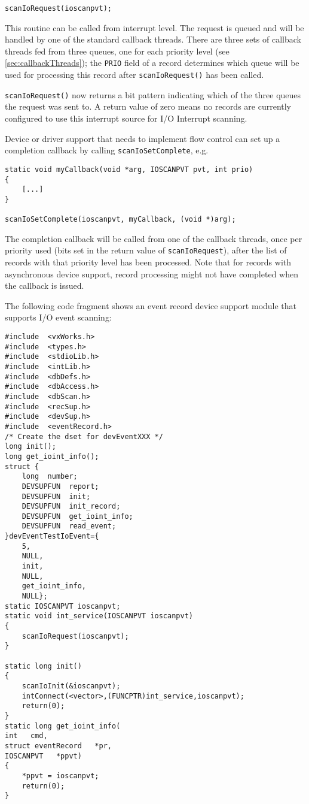 \begin{enumerate}
\begin{verbatim}
scanIoRequest(ioscanpvt);
\end{verbatim}

This routine can be called from interrupt level.
The request is queued and will be handled by one of the standard callback threads.
There are three sets of callback threads fed from three queues, one for each priority level (see \ref{sec:callbackThreads}); the \verb|PRIO| field of a record determines which queue will be used for processing this record after \verb|scanIoRequest()| has been called.

\verb|scanIoRequest()| now returns a bit pattern indicating which of the three queues the request was sent to.
A return value of zero means no records are currently configured to use this interrupt source for I/O Interrupt scanning.

Device or driver support that needs to implement flow control can set up a completion callback by calling \verb|scanIoSetComplete|, e.g.

\begin{verbatim}
static void myCallback(void *arg, IOSCANPVT pvt, int prio)
{
    [...]
}

scanIoSetComplete(ioscanpvt, myCallback, (void *)arg);
\end{verbatim}

The completion callback will be called from one of the callback threads, once per priority used (bits set in the return value of \verb|scanIoRequest|), after the list of records with that priority level has been processed. Note that for records with asynchronous device support, record processing might not have completed when the callback is issued.
\end{enumerate}

The following code fragment shows an event record device support module that supports I/O event scanning: 

\begin{verbatim}
#include  <vxWorks.h>
#include  <types.h>
#include  <stdioLib.h>
#include  <intLib.h>
#include  <dbDefs.h>
#include  <dbAccess.h>
#include  <dbScan.h>
#include  <recSup.h>
#include  <devSup.h>
#include  <eventRecord.h>
/* Create the dset for devEventXXX */
long init();
long get_ioint_info();
struct {
    long  number;
    DEVSUPFUN  report;
    DEVSUPFUN  init;
    DEVSUPFUN  init_record;
    DEVSUPFUN  get_ioint_info;
    DEVSUPFUN  read_event;
}devEventTestIoEvent={
    5,
    NULL,
    init,
    NULL,
    get_ioint_info,
    NULL};
static IOSCANPVT ioscanpvt;
static void int_service(IOSCANPVT ioscanpvt)
{
    scanIoRequest(ioscanpvt);
}

static long init()
{
    scanIoInit(&ioscanpvt);
    intConnect(<vector>,(FUNCPTR)int_service,ioscanpvt);
    return(0);
}
static long get_ioint_info(
int   cmd,
struct eventRecord   *pr,
IOSCANPVT   *ppvt)
{
    *ppvt = ioscanpvt;
    return(0);
}
\end{verbatim}

